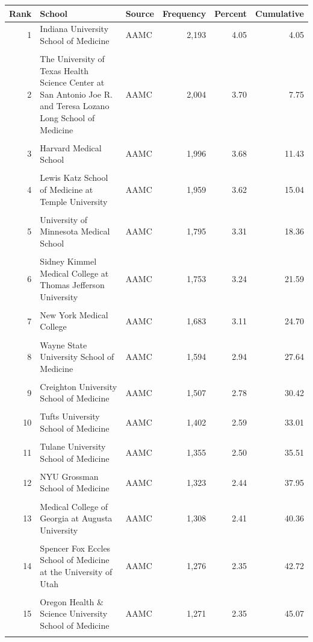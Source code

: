 \begin{tabular}{r p{} l r r r}
\toprule
Rank & School & Source & Frequency & Percent & Cumulative \\ \midrule
1 & Indiana University School of Medicine & AAMC & 2,193 & 4.05 & 4.05 \\\\
2 & The University of Texas Health Science Center at San Antonio Joe R. and Teresa Lozano Long School of Medicine & AAMC & 2,004 & 3.70 & 7.75 \\\\
3 & Harvard Medical School & AAMC & 1,996 & 3.68 & 11.43 \\\\
4 & Lewis Katz School of Medicine at Temple University & AAMC & 1,959 & 3.62 & 15.04 \\\\
5 & University of Minnesota Medical School & AAMC & 1,795 & 3.31 & 18.36 \\\\
6 & Sidney Kimmel Medical College at Thomas Jefferson University & AAMC & 1,753 & 3.24 & 21.59 \\\\
7 & New York Medical College & AAMC & 1,683 & 3.11 & 24.70 \\\\
8 & Wayne State University School of Medicine & AAMC & 1,594 & 2.94 & 27.64 \\\\
9 & Creighton University School of Medicine & AAMC & 1,507 & 2.78 & 30.42 \\\\
10 & Tufts University School of Medicine & AAMC & 1,402 & 2.59 & 33.01 \\\\
11 & Tulane University School of Medicine & AAMC & 1,355 & 2.50 & 35.51 \\\\
12 & NYU Grossman School of Medicine & AAMC & 1,323 & 2.44 & 37.95 \\\\
13 & Medical College of Georgia at Augusta University & AAMC & 1,308 & 2.41 & 40.36 \\\\
14 & Spencer Fox Eccles School of Medicine at the University of Utah & AAMC & 1,276 & 2.35 & 42.72 \\\\
15 & Oregon Health \& Science University School of Medicine & AAMC & 1,271 & 2.35 & 45.07 \\\\

\end{tabular}
